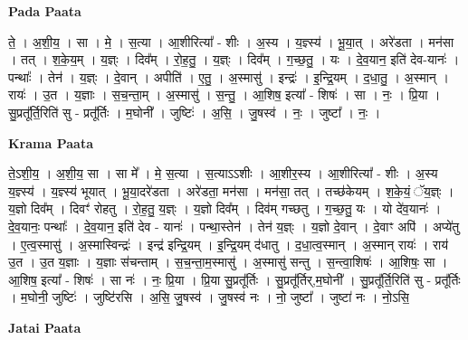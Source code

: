 \documentclass[17pt]{extarticle}
\begin{document}
\textbf{Pada Paata} \newline

ते॒ । अ॒शी॒य॒ । सा । मे॒ । स॒त्या । आ॒शीरित्या᳚ - शीः । अ॒स्य । य॒ज्ञ्स्य॑ । भू॒या॒त् । अरे॑डता । मन॑सा । तत् । श॒के॒य॒म् । य॒ज्ञ्ः । दिव᳚म् । रो॒ह॒तु॒ । य॒ज्ञ्ः । दिव᳚म् । ग॒च्छ॒तु॒ । यः । दे॒व॒यान॒ इति॑ देव-यानः॑ । पन्थाः᳚ । तेन॑ । य॒ज्ञ्ः । दे॒वान् । अपीति॑ । ए॒तु॒ । अ॒स्मासु॑ । इन्द्रः॑ । इ॒न्द्रि॒यम् । द॒धा॒तु॒ । अ॒स्मान् । रायः॑ । उ॒त । य॒ज्ञाः । स॒च॒न्ता॒म् । अ॒स्मासु॑ । स॒न्तु॒ । आ॒शिष॒ इत्या᳚ - शिषः॑ । सा । नः॒ । प्रि॒या । सु॒प्रतू᳚र्ति॒रिति॑ सु - प्रतू᳚र्तिः । म॒घोनी᳚ । जुष्टिः॑ । अ॒सि॒ । जु॒षस्व॑ । नः॒ । जुष्टा᳚ । नः॒ ।  \newline


\textbf{Krama Paata} \newline

ते॒ऽशी॒य॒ । अ॒शी॒य॒ सा । सा मे᳚ । मे॒ स॒त्या । स॒त्याऽऽशीः । आ॒शीर॒स्य । आ॒शीरित्या᳚ - शीः । अ॒स्य य॒ज्ञ्स्य॑ । य॒ज्ञ्स्य॑ भूयात् । भू॒या॒दरे॑डता । अरे॑डता॒ मन॑सा । मन॑सा॒ तत् । तच्छ॑केयम् । श॒के॒यं॒ ॅय॒ज्ञ्ः । य॒ज्ञो दिव᳚म् । दिवꣳ॑ रोहतु । रो॒ह॒तु॒ य॒ज्ञ्ः । य॒ज्ञो दिव᳚म् । दिव॑म् गच्छतु । ग॒च्छ॒तु॒ यः । यो दे॑व॒यानः॑ । दे॒व॒यानः॒ पन्थाः᳚ । दे॒व॒यान॒ इति॑ देव - यानः॑ । पन्था॒स्तेन॑ । तेन॑ य॒ज्ञ्ः । य॒ज्ञो दे॒वान् । दे॒वाꣳ अपि॑ । अप्ये॑तु । ए॒त्व॒स्मासु॑ । अ॒स्मास्विन्द्रः॑ । इन्द्र॑ इन्द्रि॒यम् । इ॒न्द्रि॒यम् द॑धातु । द॒धा॒त्व॒स्मान् । अ॒स्मान् रायः॑ । राय॑ उ॒त । उ॒त य॒ज्ञाः । य॒ज्ञाः स॑चन्ताम् । स॒च॒न्ता॒म॒स्मासु॑ । अ॒स्मासु॑ सन्तु । स॒न्त्वा॒शिषः॑ । आ॒शिषः॒ सा । आ॒शिष॒ इत्या᳚ - शिषः॑ । सा नः॑ । नः॒ प्रि॒या । प्रि॒या सु॒प्रतू᳚र्तिः । सु॒प्रतू᳚र्तिर्,म॒घोनी᳚ । सु॒प्रतू᳚र्ति॒रिति॑ सु - प्रतू᳚र्तिः । म॒घोनी॒ जुष्टिः॑ । जुष्टि॑रसि । अ॒सि॒ जु॒षस्व॑ । जु॒षस्व॑ नः । नो॒ जुष्टा᳚ । जुष्टा॑ नः । नो॒ऽसि॒ \newline

\textbf{Jatai Paata} \newline
\end{document}
